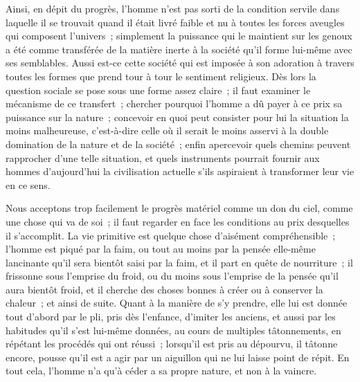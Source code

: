 \documentclass[french,twoside]{book} %
\begin{document}
Ainsi, en dépit du progrès, l'homme n'est pas sorti de la condition servile dans laquelle il se trouvait quand il était livré faible et nu à toutes les forces aveugles qui composent l'univers ; simplement la puissance qui le maintient sur les genoux a été comme transférée de la matière inerte à la société qu'il forme lui-même avec ses semblables. Aussi est-ce cette société qui est imposée à son adoration à travers toutes les formes que prend tour à tour le sentiment religieux. Dès lors la question sociale se pose sous une forme assez claire ; il faut examiner le mécanisme de ce transfert ; chercher pourquoi l'homme a dû payer à ce prix sa puissance sur la nature ; concevoir en quoi peut consister pour lui la situation la moins malheureuse, c'est-à-dire celle où il serait le moins asservi à la double domination de la nature et de la société ; enfin apercevoir quels chemins peuvent rapprocher d'une telle situation, et quels instruments pourrait fournir aux hommes d'aujourd'hui la civilisation actuelle s'ils aspiraient à transformer leur vie en ce sens.\par
Nous acceptons trop facilement le progrès matériel comme un don du ciel, comme une chose qui va de soi ; il faut regarder en face les conditions au prix desquelles il s'accomplit. La vie primitive est quelque chose d'aisément compréhensible ; l'homme est piqué par la faim, ou tout au moins par la pensée elle-même lancinante qu'il sera bientôt saisi par la faim, et il part en quête de nourriture ; il frissonne sous l'emprise du froid, ou du moins sous l'emprise de la pensée qu'il aura bientôt froid, et il cherche des choses bonnes à créer ou à conserver la chaleur ; et ainsi de suite. Quant à la manière de s'y prendre, elle lui est donnée tout d'abord par le pli, pris dès l'enfance, d'imiter les anciens, et aussi par les habitudes qu'il s'est lui-même données, au cours de multiples tâtonnements, en répétant les procédés qui ont réussi ; lorsqu'il est pris au dépourvu, il tâtonne encore, pousse qu'il est a agir par un aiguillon qui ne lui laisse point de répit. En tout cela, l'homme n'a qu'à céder a sa propre nature, et non à la vaincre.\par
\end{document}
